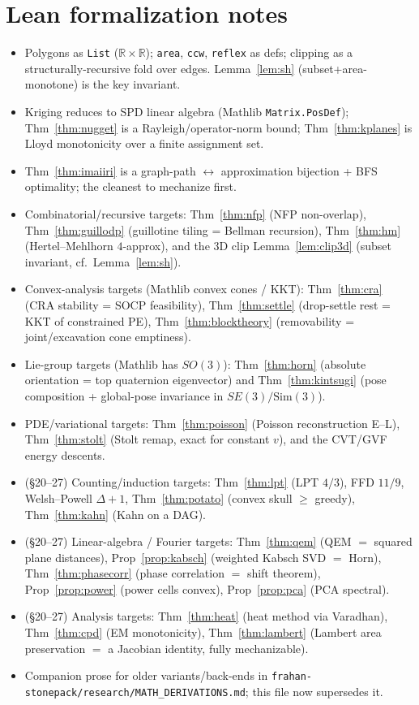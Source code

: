 \documentclass[11pt]{article}
\theoremstyle{definition}\newtheorem{definition}{Definition}[section]
\theoremstyle{plain}\newtheorem{theorem}{Theorem}[section]
\newcommand{\R}{\mathbb{R}}\newcommand{\Z}{\mathbb{Z}}\newcommand{\Norm}[1]{\lVert #1\rVert}
\begin{document}
\section*{Lean formalization notes}
\begin{itemize}[leftmargin=1.4em]
\item Polygons as \texttt{List} ($\R \times \R$); \texttt{area}, \texttt{ccw}, \texttt{reflex} as defs; clipping
as a structurally-recursive fold over edges. Lemma~\ref{lem:sh} (subset+area-monotone) is the key invariant.
\item Kriging reduces to SPD linear algebra (Mathlib \texttt{Matrix.PosDef}); Thm~\ref{thm:nugget} is a
Rayleigh/operator-norm bound; Thm~\ref{thm:kplanes} is Lloyd monotonicity over a finite assignment set.
\item Thm~\ref{thm:imaiiri} is a graph-path $\leftrightarrow$ approximation bijection + BFS optimality; the
cleanest to mechanize first.
\item Combinatorial/recursive targets: Thm~\ref{thm:nfp} (NFP non-overlap), Thm~\ref{thm:guillodp}
(guillotine tiling = Bellman recursion), Thm~\ref{thm:hm} (Hertel--Mehlhorn $4$-approx), and the 3D clip
Lemma~\ref{lem:clip3d} (subset invariant, cf.\ Lemma~\ref{lem:sh}).
\item Convex-analysis targets (Mathlib convex cones / KKT): Thm~\ref{thm:cra} (CRA stability = SOCP
feasibility), Thm~\ref{thm:settle} (drop-settle rest = KKT of constrained PE), Thm~\ref{thm:blocktheory}
(removability = joint/excavation cone emptiness).
\item Lie-group targets (Mathlib has $SO(3)$): Thm~\ref{thm:horn} (absolute orientation = top quaternion
eigenvector) and Thm~\ref{thm:kintsugi} (pose composition + global-pose invariance in $SE(3)/\mathrm{Sim}(3)$).
\item PDE/variational targets: Thm~\ref{thm:poisson} (Poisson reconstruction E--L), Thm~\ref{thm:stolt}
(Stolt remap, exact for constant $v$), and the CVT/GVF energy descents.
\item (\S20--27) Counting/induction targets: Thm~\ref{thm:lpt} (LPT $4/3$), FFD $11/9$, Welsh--Powell
$\Delta+1$, Thm~\ref{thm:potato} (convex skull $\ge$ greedy), Thm~\ref{thm:kahn} (Kahn on a DAG).
\item (\S20--27) Linear-algebra / Fourier targets: Thm~\ref{thm:qem} (QEM $=$ squared plane distances),
Prop~\ref{prop:kabsch} (weighted Kabsch SVD $=$ Horn), Thm~\ref{thm:phasecorr} (phase correlation $=$ shift
theorem), Prop~\ref{prop:power} (power cells convex), Prop~\ref{prop:pca} (PCA spectral).
\item (\S20--27) Analysis targets: Thm~\ref{thm:heat} (heat method via Varadhan), Thm~\ref{thm:cpd} (EM
monotonicity), Thm~\ref{thm:lambert} (Lambert area preservation $=$ a Jacobian identity, fully mechanizable).
\item Companion prose for older variants/back-ends in
\texttt{frahan-stonepack/research/MATH\_DERIVATIONS.md}; this file now supersedes it.
\end{itemize}
\end{document}
